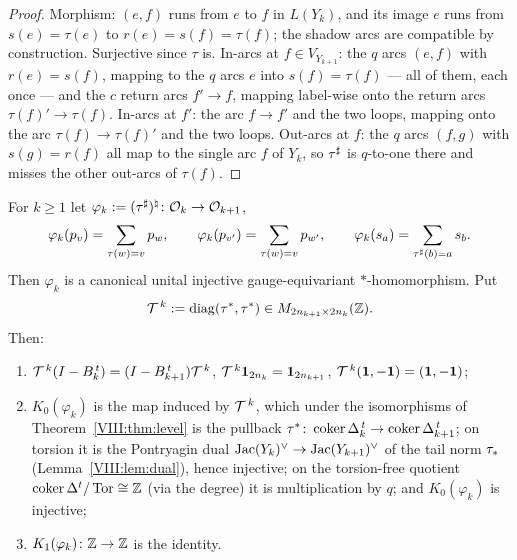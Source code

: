 \begin{proof}
Morphism: $(e,f)$ runs from $e$ to $f$ in $L(Y_k)$, and its image $e$ runs from
$s(e)=\tau(e)$ to $r(e)=s(f)=\tau(f)$; the shadow arcs are compatible by construction.
Surjective since $\tau$ is. In-arcs at $f\in V_{Y_{k+1}}$: the $q$ arcs $(e,f)$ with
$r(e)=s(f)$, mapping to the $q$ arcs $e$ into $s(f)=\tau(f)$ --- all of them, each once ---
and the $c$ return arcs $f'\to f$, mapping label-wise onto the return arcs
$\tau(f)'\to\tau(f)$. In-arcs at $f'$: the arc $f\to f'$ and the two loops, mapping onto
the arc $\tau(f)\to\tau(f)'$ and the two loops. Out-arcs at $f$: the $q$ arcs $(f,g)$
with $s(g)=r(f)$ all map to the single arc $f$ of $Y_k$, so ${\tau}^{\sharp}$ is $q$-to-one
there and misses the other out-arcs of $\tau(f)$.
\end{proof}

\begin{theorem}\label{VIII:thm:transfer}
For $k\ge1$ let $\varphi_k:=({\tau}^{\sharp})^{\natural}\colon\mathcal{O}_k\to\mathcal{O}_{k+1}$,
\[
\varphi_k(p_v)=\sum_{\tau(w)=v}p_w,\qquad \varphi_k(p_{v'})=\sum_{\tau(w)=v}p_{w'},\qquad
\varphi_k(s_a)=\sum_{{\tau}^{\sharp}(b)=a}s_b .
\]
Then $\varphi_k$ is a canonical unital injective gauge-equivariant $*$-homomorphism.
Put
\[
\mathcal{T}^{\,k}:=\operatorname{diag}(\tau^*,\tau^*)\in M_{2n_{k+1}\times2n_k}(\mathbb{Z}).
\]
Then:
\begin{enumerate}
\item[(i)] $\mathcal{T}^{\,k}(I-B_k^{\,t})=(I-B_{k+1}^{\,t})\mathcal{T}^{\,k}$, $\mathcal{T}^{\,k}\mathbf1_{2n_k}=\mathbf1_{2n_{k+1}}$,
$\mathcal{T}^{\,k}(\mathbf1,-\mathbf1)=(\mathbf1,-\mathbf1)$;
\item[(ii)] $K_0(\varphi_k)$ is the map induced by $\mathcal{T}^{\,k}$, which under the
isomorphisms of Theorem~\ref{VIII:thm:level} is the pullback
$\tau^*\colon\operatorname{coker}\Delta_k^{\,t}\to\operatorname{coker}\Delta_{k+1}^{\,t}$; on torsion it is the
Pontryagin dual $\operatorname{Jac}(Y_k)^{\vee}\to\operatorname{Jac}(Y_{k+1})^{\vee}$ of the tail norm $\tau_*$
(Lemma~\ref{VIII:lem:dual}), hence injective; on the torsion-free quotient
$\operatorname{coker}\Delta^{t}/\operatorname{Tor}\cong\mathbb{Z}$ (via the degree) it is multiplication by $q$; and
$K_0(\varphi_k)$ is injective;
\item[(iii)] $K_1(\varphi_k)\colon\mathbb{Z}\to\mathbb{Z}$ is the identity.
\end{enumerate}
\end{theorem}

